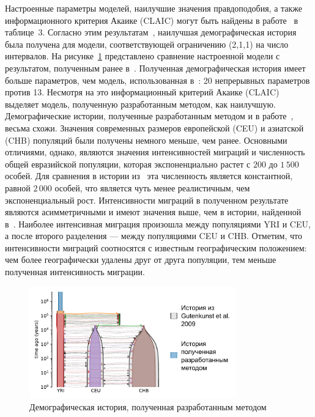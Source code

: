 Настроенные параметры моделей, наилучшие значения правдоподобия, а также информационного критерия Акаике (CLAIC) могут быть найдены в работе~\cite{noskova2020gadma} в таблице~3.
Согласно этим результатам~\cite{noskova2020gadma}, наилучшая демографическая история была получена для модели, соответствующей ограничению (2,1,1) на число интервалов.
На рисунке~\ref{fig:part4:experiments:3pop_human:result} представлено сравнение настроенной модели с результатом, полученным ранее в~\cite{gutenkunst2009inferring}.
Полученная демографическая история имеет больше параметров, чем модель, использованная в~\cite{gutenkunst2009inferring}: 20 непрерывных параметров против 13.
Несмотря на это информационный критерий Акаике (CLAIC) выделяет модель, полученную разработанным методом, как наилучшую.
Демографические истории, полученные разработанным методом и в работе~\cite{gutenkunst2009inferring}, весьма схожи.
Значения современных размеров европейской (CEU) и азиатской (CHB) популяций были получены немного меньше, чем ранее.
Основными отличиями, однако, являются значения интенсивностей миграций и численность общей евразийской популяции, которая экспоненциально растет с $200$ до $1{\,}500$ особей.
Для сравнения в истории из~\cite{gutenkunst2009inferring} эта численность является константной, равной $2{\,}000$ особей, что является чуть менее реалистичным, чем экспоненциальный рост.
Интенсивности миграций в полученном результате являются асимметричными и имеют значения выше, чем в истории, найденной в~\cite{gutenkunst2009inferring}.
Наиболее интенсивная миграция произошла между популяциями YRI и CEU, а после второго разделения --- между популяциями CEU и CHB.
Отметим, что интенсивности миграций соотносятся с известным географическим положением: чем более географически удалены друг от друга популяции, тем меньше полученная интенсивность миграции. 
\begin{figure}[ht]
    \centering
        \includegraphics[width=0.8\textwidth]{images_experiments/3pop_human_gutenkunst/picture_3pop_result.pdf}
    \caption{Демографическая история, полученная разработанным методом}
    \label{fig:part4:experiments:3pop_human:result}
\end{figure}


